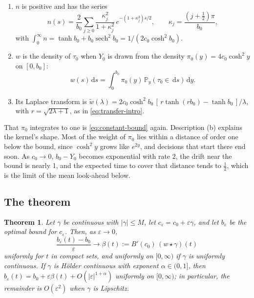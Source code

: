 \documentclass[11pt]{article}
\newtheorem{theorem}{Theorem}
\theoremstyle{definition}
\theoremstyle{remark}
\renewcommand{\P}{\mathbb{P}}
\newcommand{\dd}{\,\mathrm{d}}
\newcommand{\sech}{\operatorname{sech}}
\begin{document}
\begin{lemma}
\label{lem:kernel}
\begin{enumerate}
  \item[(a)] $n$ is positive and has the series
    \begin{equation}
      n(s) = \frac{2}{b_0}\sum_{j \ge 0} \frac{\kappa_j^2}{1 + \kappa_j^2}\,
      e^{-(1 + \kappa_j^2)s/2}, \qquad \kappa_j = \frac{(j + \frac12)\pi}{b_0},
      \label{eq:series}
    \end{equation}
    with $\int_0^\infty n = \tanh b_0 + b_0\sech^2 b_0 = 1/(2c_0\cosh^2 b_0)$.
  \item[(b)] $w$ is the density of $\tau_0$ when $Y_0$ is drawn from the density
    $\pi_0(y) = 4c_0\cosh^2 y$ on $[0, b_0]$:
    \begin{equation}
      w(s)\dd s = \int_0^{b_0} \pi_0(y)\,\P_y(\tau_0 \in \dd s)\dd y.
      \label{eq:mixture}
    \end{equation}
  \item[(c)] Its Laplace transform is
    $\tilde w(\lambda) = 2c_0\cosh^2 b_0\,[\,r\tanh(rb_0) - \tanh b_0\,]/\lambda$, with
    $r = \sqrt{2\lambda + 1}$, as in \eqref{eq:transfer-intro}.
\end{enumerate}
\end{lemma}

That $\pi_0$ integrates to one is \eqref{eq:constant-bound} again. Description (b) explains the
kernel's shape. Most of the weight of $\pi_0$ lies within a distance of order one below the bound,
since $\cosh^2 y$ grows like $e^{2y}$, and decisions that start there end soon. As $c_0 \to 0$,
$b_0 - Y_0$ becomes exponential with rate 2, the drift near the bound is nearly 1, and the
expected time to cover that distance tends to $\tfrac12$, which is the limit of the mean
look-ahead below.

\subsection{The theorem}

\begin{theorem}
\label{thm:main}
Let $\gamma$ be continuous with $|\gamma| \le M$, let $c_\varepsilon = c_0 + \varepsilon\gamma$,
and let $b_\varepsilon$ be the optimal bound for $c_\varepsilon$. Then, as $\varepsilon \to 0$,
\begin{equation}
  \frac{b_\varepsilon(t) - b_0}{\varepsilon} \longrightarrow \beta(t) := B'(c_0)\,(w \star \gamma)(t)
\end{equation}
uniformly for $t$ in compact sets, and uniformly on $[0, \infty)$ if $\gamma$ is uniformly
continuous. If $\gamma$ is Hölder continuous with exponent $\alpha \in (0, 1]$, then
$b_\varepsilon(t) = b_0 + \varepsilon\beta(t) + O(|\varepsilon|^{1+\alpha})$ uniformly on
$[0, \infty)$; in particular, the remainder is $O(\varepsilon^2)$ when $\gamma$ is Lipschitz.
\end{theorem}
\end{document}
